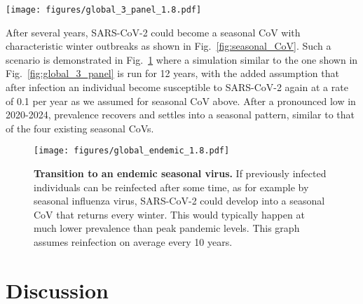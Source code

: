 \documentclass[rmp, reprint, superscriptaddress, floatfix,amsmath]{revtex4-1}
\begin{document}
\begin{figure*}[tb]
    \centering
    \texttt{[image: figures/global\_3\_panel\_1.8.pdf]}
    \caption{{\bf Extended circulation through overlapping epidemics in variable subpopulations.} These simulations of a pandemic scenario assume 1,000 sub-populations with an average $\langle R_0\rangle$ of 1.8 and standard deviation $0.5$, 40\% of which have weak seasonal forcing $\epsilon \in [0,0.2]$ (tropical) and the remainder have strong variation with $\epsilon \in [0.25,0.75]$. The super-position of many variable epidemics can result in a global prevalence that decays only slowly through 2020 and 2021. 
    Lighter lines have lower $R_0$, darker lines have higher $R_0$. 
    The actual observed case counts reported for Hubei are added (brown line) and multiplied by three to account for possible under-reporting of mild cases. A subset of 30 randomly chosen simulations are plotted for each region.
    Analogous figures for different $R_0$ parameter values are shown in Supplementary Fig.~\ref{fig:global_3_panel_supp}.}
    \label{fig:global_3_panel}
\end{figure*}

After several years, SARS-CoV-2 could become a seasonal CoV with characteristic winter outbreaks as shown in Fig.~\ref{fig:seasonal_CoV}.
Such a scenario is demonstrated in Fig.~\ref{fig:endemic} where a simulation similar to the one shown in Fig.~\ref{fig:global_3_panel} is run for 12 years, with the added assumption that after infection an individual become susceptible to SARS-CoV-2 again at a rate of 0.1 per year as we assumed for seasonal CoV above. 
After a pronounced low in 2020-2024, prevalence recovers and settles into a seasonal pattern, similar to that of the four existing seasonal CoVs. 

\begin{figure}
    \centering
    \texttt{[image: figures/global\_endemic\_1.8.pdf]}
    \caption{{\bf Transition to an endemic seasonal virus.} 
    If previously infected individuals can be reinfected after some time, as for example by seasonal influenza virus, SARS-CoV-2 could develop into a seasonal CoV that returns every winter. This would typically happen at much lower prevalence than peak pandemic levels. 
    This graph assumes reinfection on average every 10 years.}
    \label{fig:endemic}
\end{figure}

\section{Discussion}
\end{document}
